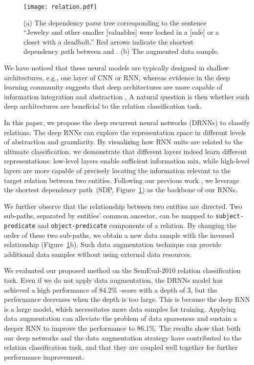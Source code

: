 \documentclass[11pt]{article}
\begin{document}
\begin{figure}[!t]
\centering
\texttt{[image: relation.pdf]}
\caption{(a) The dependency parse tree corresponding to the sentence ``Jewelry and other smaller [valuables] were locked in a [safe] or a closet with a deadbolt.''
Red arrows indicate the shortest dependency path between  and . (b) The augmented data sample.}\label{fig:example}
\end{figure}

We have noticed that these neural models are typically designed in shallow architectures, e.g., one layer of CNN or RNN, whereas evidence in the deep learning community suggests that deep architectures are more capable of information integration and abstraction \cite{SpeechDRNN,TrainDRNN,OpinionDRNN}. A natural question is then whether such deep architectures are beneficial to the relation classification task.

In this paper, we propose the deep recurrent neural networks (DRNNs) to classify relations. The deep RNNs can explore the representation space in different levels of abstraction and granularity. By visualizing how RNN units are related to the ultimate classification, we demonstrate that different layers indeed learn different representations: low-level layers enable sufficient information mix, while high-level layers are more capable of precisely locating the information relevant to the target relation between two entities. Following our previous work \cite{SDP-LSTM}, we leverage the shortest dependency path~(SDP, Figure~\ref{fig:example}) as the backbone of our RNNs.






We further observe that the relationship between two entities are directed. Two sub-paths, separated by entities' common ancestor, can be mapped to {\tt subject-predicate} and {\tt object-predicate} components of a relation. By changing the order of these two sub-paths, we obtain a new data sample with the inversed relationship (Figure~\ref{fig:example}b). Such data augmentation technique can provide additional data samples without using external data resources.



We evaluated our proposed method on the SemEval-2010 relation classification task. Even if we do not apply data augmentation, the DRNNs model has achieved a high performance of 84.2\% -score with a depth of 3, but the performance decreases when the depth is too large. This is because the deep RNN is a large model, which necessitates more data samples for training. Applying data augmentation can alleviate the problem of data sparseness and sustain a deeper RNN to improve the performance to 86.1\%.
The results show that both our deep networks and the data augmentation strategy have contributed to the relation classification task, and that they are coupled well together for further performance improvement.
\end{document}
